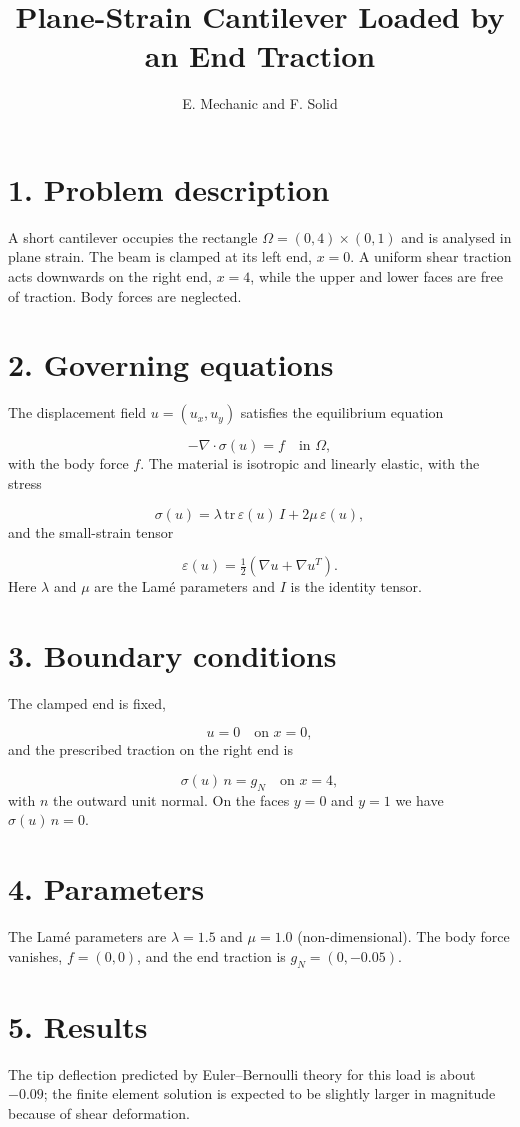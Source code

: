 \documentclass[11pt,a4paper]{article}
\title{Plane-Strain Cantilever Loaded by an End Traction}\author{E. Mechanic and F. Solid}\date{}
\begin{document}
\maketitle
\section*{1. Problem description}
A short cantilever occupies the rectangle $\Omega=(0,4)\times(0,1)$ and is analysed in plane strain. The beam is clamped at its left end, $x=0$. A uniform shear traction acts downwards on the right end, $x=4$, while the upper and lower faces are free of traction. Body forces are neglected.

\section*{2. Governing equations}
The displacement field $u=(u_x,u_y)$ satisfies the equilibrium equation

\begin{equation}
-\nabla\cdot\sigma(u) = f \quad \text{in } \Omega ,
\end{equation}
with the body force $f$. The material is isotropic and linearly elastic, with the stress

\begin{equation}
\sigma(u) = \lambda\,\mathrm{tr}\,\varepsilon(u)\, I + 2\mu\,\varepsilon(u),
\end{equation}
and the small-strain tensor

\begin{equation}
\varepsilon(u) = \tfrac{1}{2}\left(\nabla u + \nabla u^{T}\right) .
\end{equation}
Here $\lambda$ and $\mu$ are the Lam\'e parameters and $I$ is the identity tensor.

\section*{3. Boundary conditions}
The clamped end is fixed,

\begin{equation}
u = 0 \quad \text{on } x=0 ,
\end{equation}
and the prescribed traction on the right end is

\begin{equation}
\sigma(u)\,n = g_N \quad \text{on } x=4 ,
\end{equation}
with $n$ the outward unit normal. On the faces $y=0$ and $y=1$ we have $\sigma(u)\,n=0$.

\section*{4. Parameters}
The Lam\'e parameters are $\lambda=1.5$ and $\mu=1.0$ (non-dimensional). The body force vanishes, $f=(0,0)$, and the end traction is $g_N=(0,-0.05)$.

\section*{5. Results}
The tip deflection predicted by Euler--Bernoulli theory for this load is about $-0.09$; the finite element solution is expected to be slightly larger in magnitude because of shear deformation.
\end{document}

